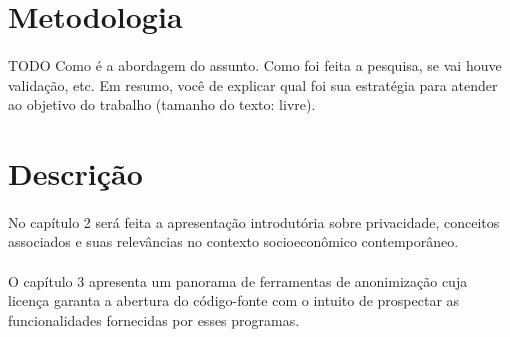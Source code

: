 \section{Metodologia}

\paragraph{} TODO Como é a abordagem do assunto. Como foi feita a pesquisa, se
vai houve validação, etc. Em resumo, você de explicar qual foi sua estratégia
para atender ao objetivo do trabalho (tamanho do texto: livre).


\section{Descrição}

\paragraph{}No capítulo 2 será feita a apresentação introdutória sobre
privacidade, conceitos associados e suas relevâncias no contexto socioeconômico
contemporâneo.

\paragraph{}O capítulo 3 apresenta um panorama de ferramentas de anonimização
cuja licença garanta a abertura do código-fonte com o intuito de prospectar as
funcionalidades fornecidas por esses programas.
